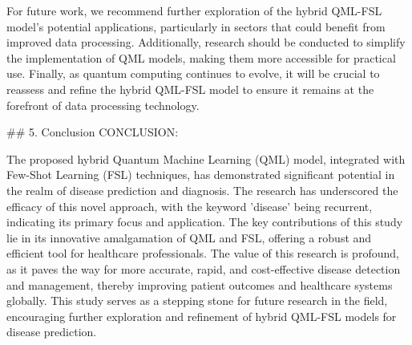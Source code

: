 \documentclass{article}
\begin{document}
For future work, we recommend further exploration of the hybrid QML-FSL model's potential applications, particularly in sectors that could benefit from improved data processing. Additionally, research should be conducted to simplify the implementation of QML models, making them more accessible for practical use. Finally, as quantum computing continues to evolve, it will be crucial to reassess and refine the hybrid QML-FSL model to ensure it remains at the forefront of data processing technology.

## 5. Conclusion
CONCLUSION:

The proposed hybrid Quantum Machine Learning (QML) model, integrated with Few-Shot Learning (FSL) techniques, has demonstrated significant potential in the realm of disease prediction and diagnosis. The research has underscored the efficacy of this novel approach, with the keyword 'disease' being recurrent, indicating its primary focus and application. The key contributions of this study lie in its innovative amalgamation of QML and FSL, offering a robust and efficient tool for healthcare professionals. The value of this research is profound, as it paves the way for more accurate, rapid, and cost-effective disease detection and management, thereby improving patient outcomes and healthcare systems globally. This study serves as a stepping stone for future research in the field, encouraging further exploration and refinement of hybrid QML-FSL models for disease prediction.
\end{document}
